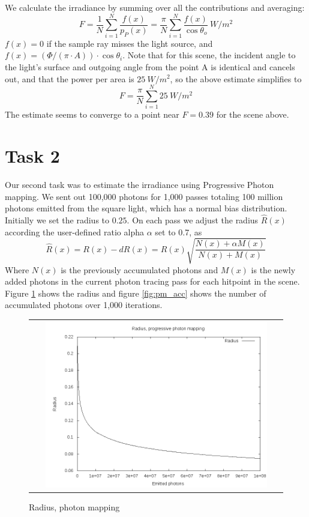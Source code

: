 \documentclass{article} %
\begin{document}
We calculate the irradiance by summing over all the contributions and averaging:
$$F=\frac{1}{N}\sum_{i=1}^N \frac{f(x)}{p_P(x)} = \frac{\pi}{N}\sum_{i=1}^N \frac{f(x)}{\cos \theta_o}\ W/m^2$$
$f(x) = 0$ if the sample ray misses the light source, and $f(x) = (\Phi/(\pi\cdot A))\cdot \cos \theta_i$. Note that for this scene, the incident angle to the light's surface and outgoing angle from the point A is identical and cancels out, and that the power per area is $25\ W/m^2$, so the above estimate simplifies to 
$$F=\frac{\pi}{N}\sum_{i=1}^N 25\ W/m^2$$
The estimate seems to converge to a point near $F=0.39$ for the scene above. 

\section*{Task 2}
Our second task was to estimate the irradiance using Progressive Photon mapping.  We sent out 100,000 photons for 1,000 passes totaling 100 million photons emitted from the square light, which has a normal bias distribution. Initially we set the radius to $0.25$. On each pass we adjust the radius $\hat{R}(x)$ according the user-defined ratio alpha $\alpha$ set to 0.7, as
$$ \hat{R}(x) = R(x) - dR(x) = R(x)\sqrt{\frac{N(x)+\alpha M(x)}{N(x)+M(x)}}$$
Where $N(x)$ is the previously accumulated photons and $M(x)$ is the newly added photons in the current photon tracing pass for each hitpoint in the scene. Figure \ref{fig:pm_radius} shows the radius and figure \ref{fig:pm_acc} shows the number of accumulated photons over 1,000 iterations.

\begin{figure}[H]
\begin{tabular}{c}
\includegraphics[width=0.9\textwidth]{plots/irrad_photonmap_radius.png}\\
\end{tabular}
\caption{Radius, photon mapping}
\label{fig:pm_radius}
\end{figure}
\end{document}
